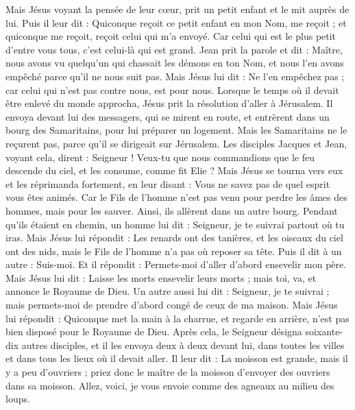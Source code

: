 \begin{multicols}{2}
Mais Jésus voyant la pensée de leur cœur, prit un petit enfant et le mit auprès de lui.
Puis il leur dit : Quiconque reçoit ce petit enfant en mon Nom, me reçoit ; et quiconque me reçoit, reçoit celui qui m'a envoyé. Car celui qui est le plus petit d'entre vous tous, c'est celui-là qui est grand.
\TextTitle{[grandeur]}
Jean prit la parole et dit : Maître, nous avons vu quelqu'un qui chassait les démons en ton Nom, et nous l'en avons empêché parce qu'il ne nous suit pas.
Mais Jésus lui dit : Ne l'en empêchez pas ; car celui qui n'est pas contre nous, est pour nous.
Lorsque le temps où il devait être enlevé du monde approcha, Jésus prit la résolution d'aller à Jérusalem.
Il envoya devant lui des messagers, qui se mirent en route, et entrèrent dans un bourg des Samaritains, pour lui préparer un logement.
Mais les Samaritains ne le reçurent pas, parce qu'il se dirigeait sur Jérusalem.
Les disciples Jacques et Jean, voyant cela, dirent : Seigneur ! Veux-tu que nous commandions que le feu descende du ciel, et les consume, comme fit Elie ?
Mais Jésus se tourna vers eux et les réprimanda fortement, en leur disant : Vous ne savez pas de quel esprit vous êtes animés.
Car le Fils de l'homme n'est pas venu pour perdre les âmes des hommes, mais pour les sauver. Ainsi, ils allèrent dans un autre bourg.
Pendant qu’ils étaient en chemin, un homme lui dit : Seigneur, je te suivrai partout où tu iras.
Mais Jésus lui répondit : Les renards ont des tanières, et les oiseaux du ciel ont des nids, mais le Fils de l'homme n'a pas où reposer sa tête.
Puis il dit à un autre : Suis-moi. Et il répondit : Permets-moi d'aller d’abord ensevelir mon père.
Mais Jésus lui dit : Laisse les morts ensevelir leurs morts ; mais toi, va, et annonce le Royaume de Dieu.
Un autre aussi lui dit : Seigneur, je te suivrai ; mais permets-moi de prendre d’abord congé de ceux de ma maison.
Mais Jésus lui répondit : Quiconque met la main à la charrue, et regarde en arrière, n'est pas bien disposé pour le Royaume de Dieu.
\VerseOne{}Après cela, le Seigneur désigna soixante-dix autres disciples, et il les envoya deux à deux devant lui, dans toutes les villes et dans tous les lieux où il devait aller.
Il leur dit : La moisson est grande, mais il y a peu d'ouvriers ; priez donc le maître de la moisson d’envoyer des ouvriers dans sa moisson.
Allez, voici, je vous envoie comme des agneaux au milieu des loups.

\end{multicols}
